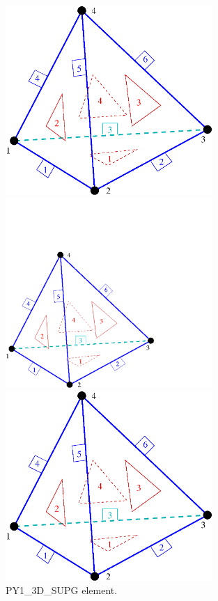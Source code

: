 \documentclass[a4paper]{article}
\begin{document}
\begin{figure}[tb]
\begin{htmlonly}
  \centerline{\includegraphics[width=0.7\textwidth]{tetrahedra_lin.eps}}
\end{htmlonly}
\ifpdf
 \centerline{\includegraphics[width=0.7\textwidth]{tetrahedra_lin.pdf}}
\else
 \centerline{\includegraphics[width=0.7\textwidth]{tetrahedra_lin.eps}}
\fi
\caption{PY1\_3D\_SUPG element.}
\label{PY1_3D_SUPGfig}
\end{figure}
\end{document}
